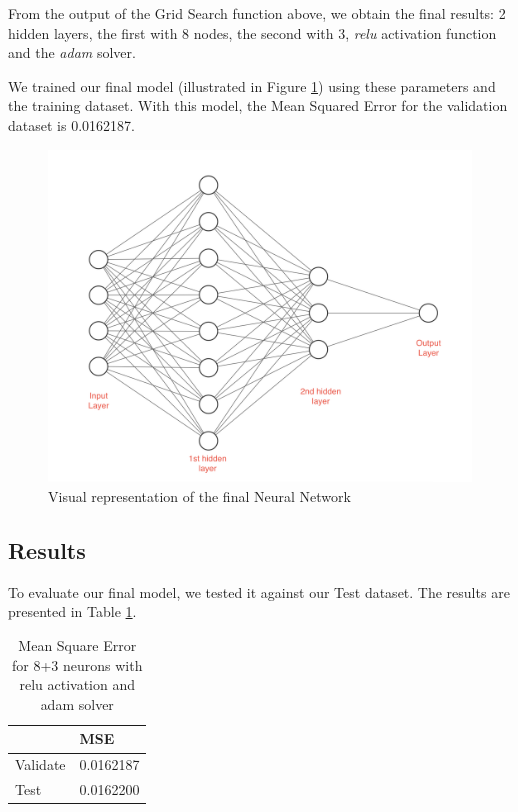 From the output of the Grid Search function above, we obtain the final results: 2 hidden layers, the first with 8 nodes, the second with 3, \textit{relu} activation function and the \textit{adam} solver.

We trained our final model (illustrated in Figure \ref{fig:NN_diagram}) using these parameters and the training dataset. With this model, the Mean Squared Error for the validation dataset is 0.0162187.

\begin{figure}[H]
    \centering
    \includegraphics[width=\textwidth]{images/NN_diagram.png}
    \caption{Visual representation of the final Neural Network}
    \label{fig:NN_diagram}
\end{figure}


\subsection{Results}

To evaluate our final model, we tested it against our Test dataset. The results are presented in Table \ref{tab:MSE_11_relu_adam}.

\begin{table}[H]
    \centering
    \begin{tabular}{l|l|}
        \cline{2-2}
                                       & MSE       \\ \hline
        \multicolumn{1}{|l|}{Validate} & 0.0162187 \\ \hline
        \multicolumn{1}{|l|}{Test}     & 0.0162200 \\ \hline
    \end{tabular}
    \caption{Mean Square Error for 8+3 neurons with relu activation and adam solver}
    \label{tab:MSE_11_relu_adam}
\end{table}

